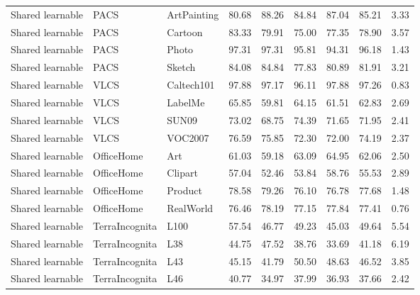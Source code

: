 \begin{longtable}{lllrrrrrr}
Shared learnable & PACS & ArtPainting & 80.68 & 88.26 & 84.84 & 87.04 & 85.21 & 3.33 \\
Shared learnable & PACS & Cartoon & 83.33 & 79.91 & 75.00 & 77.35 & 78.90 & 3.57 \\
Shared learnable & PACS & Photo & 97.31 & 97.31 & 95.81 & 94.31 & 96.18 & 1.43 \\
Shared learnable & PACS & Sketch & 84.08 & 84.84 & 77.83 & 80.89 & 81.91 & 3.21 \\
Shared learnable & VLCS & Caltech101 & 97.88 & 97.17 & 96.11 & 97.88 & 97.26 & 0.83 \\
Shared learnable & VLCS & LabelMe & 65.85 & 59.81 & 64.15 & 61.51 & 62.83 & 2.69 \\
Shared learnable & VLCS & SUN09 & 73.02 & 68.75 & 74.39 & 71.65 & 71.95 & 2.41 \\
Shared learnable & VLCS & VOC2007 & 76.59 & 75.85 & 72.30 & 72.00 & 74.19 & 2.37 \\
Shared learnable & OfficeHome & Art & 61.03 & 59.18 & 63.09 & 64.95 & 62.06 & 2.50 \\
Shared learnable & OfficeHome & Clipart & 57.04 & 52.46 & 53.84 & 58.76 & 55.53 & 2.89 \\
Shared learnable & OfficeHome & Product & 78.58 & 79.26 & 76.10 & 76.78 & 77.68 & 1.48 \\
Shared learnable & OfficeHome & RealWorld & 76.46 & 78.19 & 77.15 & 77.84 & 77.41 & 0.76 \\
Shared learnable & TerraIncognita & L100 & 57.54 & 46.77 & 49.23 & 45.03 & 49.64 & 5.54 \\
Shared learnable & TerraIncognita & L38 & 44.75 & 47.52 & 38.76 & 33.69 & 41.18 & 6.19 \\
Shared learnable & TerraIncognita & L43 & 45.15 & 41.79 & 50.50 & 48.63 & 46.52 & 3.85 \\
Shared learnable & TerraIncognita & L46 & 40.77 & 34.97 & 37.99 & 36.93 & 37.66 & 2.42 \\
\end{longtable}
